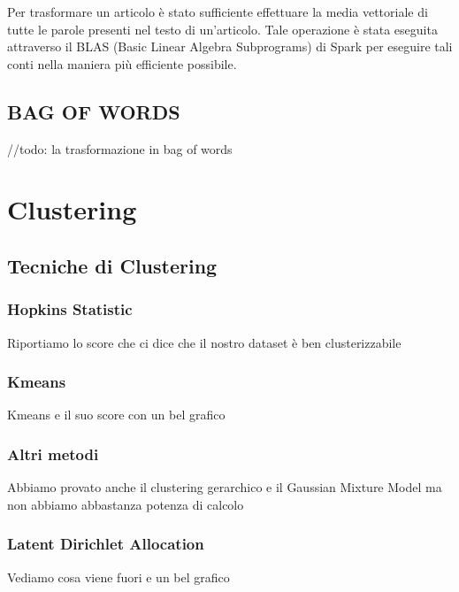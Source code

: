 \documentclass[
12pt, %
a4paper, %
oneside, %
headinclude,footinclude, %
BCOR5mm, %
]{scrartcl}
\begin{document}
        Per trasformare un articolo è stato sufficiente effettuare la media vettoriale di tutte le parole presenti
        nel testo di un'articolo. Tale operazione è stata eseguita attraverso il BLAS (Basic Linear Algebra Subprograms)
        di Spark per eseguire tali conti nella maniera più efficiente possibile.




	\subsection{BAG OF WORDS}

		//todo: la trasformazione in bag of words



\section{Clustering}

	\subsection{Tecniche di Clustering}

		\subsubsection{Hopkins Statistic}

			Riportiamo lo score che ci dice che il nostro dataset è ben clusterizzabile

		\subsubsection{Kmeans}

			Kmeans e il suo score con un bel grafico

		\subsubsection{Altri metodi}

			Abbiamo provato anche il clustering gerarchico e il Gaussian Mixture Model
			ma non abbiamo abbastanza potenza di calcolo

		\subsubsection{Latent Dirichlet Allocation}

			Vediamo cosa viene fuori e un bel grafico
\end{document}
